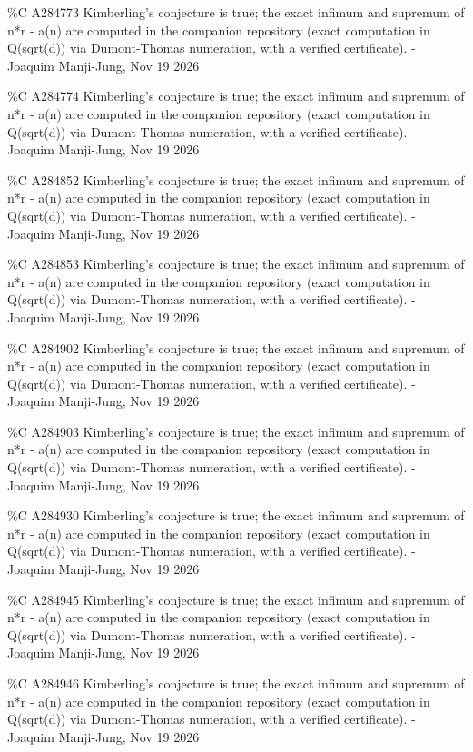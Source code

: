 {\%C A284773 Kimberling's conjecture is true; the exact infimum and supremum of n*r - a(n) are computed in the companion repository (exact computation in Q(sqrt(d)) via Dumont-Thomas numeration, with a verified certificate). - Joaquim Manji-Jung, Nov 19 2026\par
\%C A284774 Kimberling's conjecture is true; the exact infimum and supremum of n*r - a(n) are computed in the companion repository (exact computation in Q(sqrt(d)) via Dumont-Thomas numeration, with a verified certificate). - Joaquim Manji-Jung, Nov 19 2026\par
\%C A284852 Kimberling's conjecture is true; the exact infimum and supremum of n*r - a(n) are computed in the companion repository (exact computation in Q(sqrt(d)) via Dumont-Thomas numeration, with a verified certificate). - Joaquim Manji-Jung, Nov 19 2026\par
\%C A284853 Kimberling's conjecture is true; the exact infimum and supremum of n*r - a(n) are computed in the companion repository (exact computation in Q(sqrt(d)) via Dumont-Thomas numeration, with a verified certificate). - Joaquim Manji-Jung, Nov 19 2026\par
\%C A284902 Kimberling's conjecture is true; the exact infimum and supremum of n*r - a(n) are computed in the companion repository (exact computation in Q(sqrt(d)) via Dumont-Thomas numeration, with a verified certificate). - Joaquim Manji-Jung, Nov 19 2026\par
\%C A284903 Kimberling's conjecture is true; the exact infimum and supremum of n*r - a(n) are computed in the companion repository (exact computation in Q(sqrt(d)) via Dumont-Thomas numeration, with a verified certificate). - Joaquim Manji-Jung, Nov 19 2026\par
\%C A284930 Kimberling's conjecture is true; the exact infimum and supremum of n*r - a(n) are computed in the companion repository (exact computation in Q(sqrt(d)) via Dumont-Thomas numeration, with a verified certificate). - Joaquim Manji-Jung, Nov 19 2026\par
\%C A284945 Kimberling's conjecture is true; the exact infimum and supremum of n*r - a(n) are computed in the companion repository (exact computation in Q(sqrt(d)) via Dumont-Thomas numeration, with a verified certificate). - Joaquim Manji-Jung, Nov 19 2026\par
\%C A284946 Kimberling's conjecture is true; the exact infimum and supremum of n*r - a(n) are computed in the companion repository (exact computation in Q(sqrt(d)) via Dumont-Thomas numeration, with a verified certificate). - Joaquim Manji-Jung, Nov 19 2026\par
}
